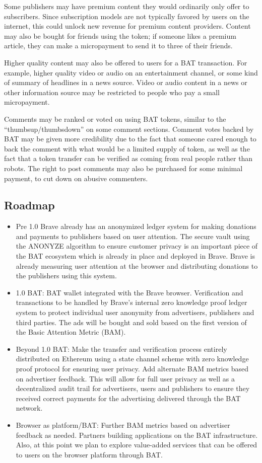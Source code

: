 \documentclass[11pt]{article}
\begin{document}
Some publishers may have premium content they would ordinarily only offer to subscribers. Since subscription models are not typically favored by users on the internet, this could unlock new revenue for premium content providers. Content may also be bought for friends using the token; if someone likes a premium article, they can make a micropayment to send it to three of their friends.

Higher quality content may also be offered to users for a BAT transaction. For example, higher quality video or audio on an entertainment channel, or some kind of summary of headlines in a news source. Video or audio content in a news or other information source may be restricted to people who pay a small micropayment.

Comments may be ranked or voted on using BAT tokens, similar to the “thumbsup/thumbsdown” on some comment sections. Comment votes backed by BAT may be given more credibility due to the fact that someone cared enough to back the comment with what would be a limited supply of token, as well as the fact that a token transfer can be verified as coming from real people rather than robots. The right to post comments may also be purchased for some minimal payment, to cut down on abusive commenters.


\subsection{Roadmap}
\label{sec-4-5}
\begin{itemize}
\item{Pre 1.0 Brave already has an anonymized ledger system for making donations and payments to publishers based on user attention. The secure vault using the ANONYZE algorithm to ensure customer privacy is an important piece of the BAT ecosystem which is already in place and deployed in Brave. Brave is already measuring user attention at the browser and distributing donations to the publishers using this system.}
\item{1.0 BAT: BAT wallet integrated with the Brave browser. Verification and transactions to be handled by Brave’s internal zero knowledge proof ledger system to protect individual user anonymity from advertisers, publishers and third parties. The ads will be bought and sold based on the first version of the Basic Attention Metric (BAM). }
\item{Beyond 1.0 BAT: Make the transfer and verification process entirely distributed on Ethereum using a state channel scheme with zero knowledge proof protocol for ensuring user privacy. Add alternate BAM metrics based on advertiser feedback. This will allow for full user privacy as well as a decentralized audit trail for advertisers, users and publishers to ensure they received correct payments for the advertising delivered through the BAT network.}
\item{Browser as platform/BAT:  Further BAM metrics based on advertiser feedback as needed. Partners building applications on the BAT infrastructure. Also, at this point we plan to explore value-added services that can be offered to users on the browser platform through BAT.}
\end{itemize}
\end{document}
